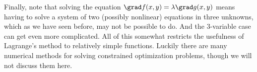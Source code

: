 Finally, note that solving the equation $\grad f(x,y) = \lambda \grad g(x,y)$ means having to solve a system of two (possibly nonlinear) equations in three unknowns, which as we have seen before, may not be possible to do. And the 3-variable case can get even more complicated. All of this somewhat restricts the usefulness of Lagrange's method to relatively simple functions. Luckily there are many numerical methods for solving constrained optimization problems, though we will not discuss them here.


